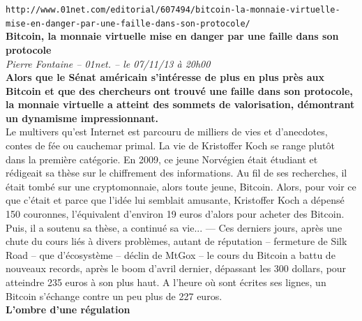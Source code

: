 \documentclass[11pt,twoside,a4paper]{article}
\begin{document}
\clearpage

\texttt{http://www.01net.com/editorial/607494/bitcoin-la-monnaie-virtuelle-mise-en-danger-par-une-faille-dans-son-protocole/}~\\

\textbf{Bitcoin, la monnaie virtuelle mise en danger par une faille dans son protocole}~\\

\emph{\small \small Pierre Fontaine -- 01net. -- le 07/11/13 {\`a} 20h00  }~\\

\textbf{Alors que le S{\'e}nat am{\'e}ricain s'int{\'e}resse de plus en plus pr{\`e}s aux Bitcoin et que des chercheurs ont trouv{\'e} une faille dans son protocole, la monnaie virtuelle a atteint des sommets de valorisation, d{\'e}montrant un dynamisme impressionnant.} ~\\

Le multivers qu'est Internet est parcouru de milliers de vies et d'anecdotes, contes de f{\'e}e ou cauchemar primal. La vie de Kristoffer Koch se range plut{\^o}t dans la premi{\`e}re cat{\'e}gorie. En 2009, ce jeune Norv{\'e}gien {\'e}tait {\'e}tudiant et r{\'e}digeait sa th{\`e}se sur le chiffrement des informations. Au fil de ses recherches, il {\'e}tait tomb{\'e} sur une cryptomonnaie, alors toute jeune, Bitcoin. Alors, pour voir ce que c'{\'e}tait et parce que l'id{\'e}e lui semblait amusante, Kristoffer Koch a d{\'e}pens{\'e} 150 couronnes, l'{\'e}quivalent d'environ 19 euros d'alors pour acheter des Bitcoin. Puis, il a soutenu sa th{\`e}se, a continu{\'e} sa vie... --- Ces derniers jours, apr{\`e}s une chute du cours li{\'e}s {\`a} divers probl{\`e}mes, autant de r{\'e}putation -- fermeture de Silk Road -- que d'{\'e}cosyst{\`e}me -- d{\'e}clin de MtGox -- le cours du Bitcoin a battu de nouveaux records, apr{\`e}s le boom d'avril dernier, d{\'e}passant les 300 dollars, pour atteindre 235 euros {\`a} son plus haut. A l'heure o{\`u} sont {\'e}crites ses lignes, un Bitcoin s'{\'e}change contre un peu plus de 227 euros. ~\\

\textbf{L'ombre d'une r{\'e}gulation} ~\\
\end{document}

